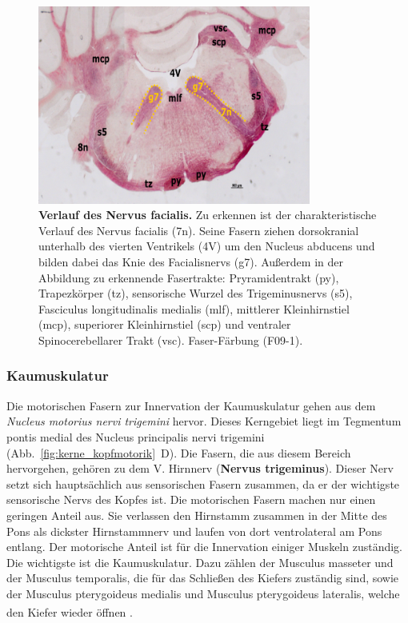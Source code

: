 \begin{figure}[H]
    \centering
    \includegraphics[width=0.8\textwidth]{pictures/Bilder_Laura/facialis_Nerv_F09_1png.png}
    \caption[Verlauf des Nervus facialis]{\textbf{Verlauf des Nervus facialis.} Zu erkennen ist der charakteristische Verlauf des Nervus facialis (7n). Seine Fasern ziehen dorsokranial unterhalb des vierten Ventrikels (4V) um den Nucleus abducens und bilden dabei das Knie des Facialisnervs (g7). Außerdem in der Abbildung zu erkennende Fasertrakte: Pryramidentrakt (py), Trapezkörper (tz), sensorische Wurzel des Trigeminusnervs (s5), Fasciculus longitudinalis medialis (mlf), mittlerer Kleinhirnstiel (mcp), superiorer Kleinhirnstiel (scp) und ventraler Spinocerebellarer Trakt (vsc). Faser-Färbung (F09-1).}
    \label{fig:nervus-facialis}
\end{figure}

\subsubsection*{Kaumuskulatur} 
Die motorischen Fasern zur Innervation der Kaumuskulatur gehen aus dem \textit{Nucleus motorius nervi trigemini}  hervor. Dieses Kerngebiet liegt im Tegmentum pontis medial des Nucleus principalis nervi trigemini (Abb.~\ref{fig:kerne_kopfmotorik}~D). Die Fasern, die aus diesem Bereich hervorgehen, gehören zu dem V. Hirnnerv (\textbf{Nervus trigeminus}). Dieser Nerv setzt sich hauptsächlich aus sensorischen Fasern zusammen, da er der wichtigste sensorische Nervs des Kopfes ist. Die motorischen Fasern machen nur einen geringen Anteil aus. Sie verlassen den Hirnstamm zusammen in der Mitte des Pons als dickster Hirnstammnerv und laufen von dort ventrolateral am Pons entlang. Der motorische Anteil ist für die Innervation einiger Muskeln zuständig. Die wichtigste ist die Kaumuskulatur. Dazu zählen der Musculus masseter und der Musculus temporalis, die für das Schließen des Kiefers zuständig sind, sowie der Musculus pterygoideus medialis und Musculus pterygoideus lateralis, welche den Kiefer wieder öffnen \textsuperscript{\cite[Kap.~10]{crossman2014neuroanatomy}}.


